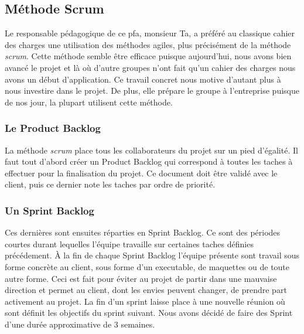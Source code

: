 \subsection{Méthode Scrum}
Le responsable pédagogique de ce pfa, monsieur Ta, a préféré au classique cahier des charges une utilisation des méthodes agiles, plus précisément de la méthode \textit{scrum}.  Cette méthode semble être efficace
puisque aujourd'hui, nous avons bien avancé le projet et là où d'autre
groupes n'ont fait qu'un cahier des charges nous avons un début
d'application. Ce travail concret nous motive d'autant plus à nous
investire dans le projet. De plus, elle prépare le groupe à
l'entreprise puisque de nos jour, la plupart utilisent cette méthode.



\subsubsection*{Le Product Backlog}
La méthode \textit{scrum} place tous les collaborateurs du projet sur un pied d'égalité. Il faut tout d'abord créer un Product Backlog qui correspond à toutes les taches à effectuer pour la finalisation du projet.
Ce document doit être validé avec le client, puis ce dernier note les taches par ordre de priorité.

\subsubsection*{Un Sprint Backlog}
Ces dernières sont ensuites réparties en Sprint Backlog. Ce sont des périodes courtes durant lequelles l'équipe travaille sur certaines taches définies précédement. 
À la fin de chaque Sprint Backlog l'équipe présente sont travail sous forme concrète au client, sous forme d'un executable, de maquettes ou de toute autre forme.
Ceci est fait pour éviter au projet de partir dans une mauvaise direction et permet au client, dont les envies peuvent changer, de prendre part activement au projet.
La fin d'un sprint laisse place à une nouvelle réunion où sont définit les objectifs du sprint suivant.
Nous avons décidé de faire des Sprint d'une durée approximative de 3 semaines.

